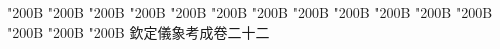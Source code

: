 \begin{正文}
\char"200B\relax{}
\char"200B\relax{}
\char"200B\relax{}
\char"200B\relax{}
\char"200B\relax{}
\char"200B\relax{}
\char"200B\relax{}
\char"200B\relax{}
\char"200B\relax{}
\char"200B\relax{}
\char"200B\relax{}
\char"200B\relax{}
\char"200B\relax{}
\char"200B\relax{}
\char"200B\relax{}
欽定儀象考成卷二十二
\par

\par\end{正文}\clearpage
